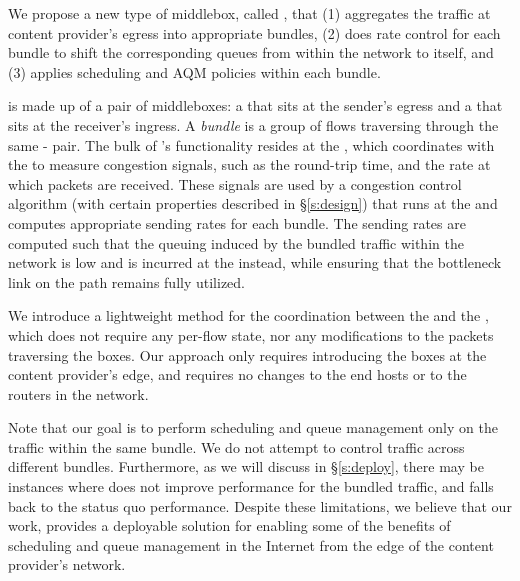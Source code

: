 We propose a new type of middlebox, called \name, that (1) aggregates the traffic at content provider's egress into appropriate bundles, (2) does rate control for each bundle to shift the corresponding queues from within the network to itself, and (3) applies scheduling and AQM policies within each bundle. 

\name is made up of a pair of middleboxes: a \emph{\inbox} that sits at the sender's egress and a \emph{\outbox} that sits at the receiver's ingress. A \emph{bundle} is a group of flows traversing through the same \inbox{}-\outbox{} pair. The bulk of \name's functionality resides at the \inbox, which coordinates with the \outbox to measure congestion signals, such as the round-trip time, and the rate at which packets are received. These signals are used by a congestion control algorithm (with certain properties described in \S\ref{s:design}) that runs at the \inbox and computes appropriate sending rates for each bundle. The sending rates are computed such that the queuing induced by the bundled traffic within the network is low and is incurred at the \inbox instead, while ensuring that the bottleneck link on the path remains fully utilized. 
 
We introduce a lightweight method for the coordination between the \inbox and the \outbox, which does not require any per-flow state, nor any modifications to the packets traversing the \name boxes. Our approach only requires introducing the \name boxes at the content provider's edge, and requires no changes to the end hosts or to the routers in the network. 
 
Note that our goal is to perform scheduling and queue management only on the traffic within the same bundle. We do not attempt to control traffic across different bundles. Furthermore, as we will discuss in \S\ref{s:deploy}, there may be instances where \name does not improve performance for the bundled traffic, and falls back to the status quo performance. Despite these limitations, we believe that our work, provides a deployable solution for enabling some of the benefits of scheduling and queue management in the Internet from the edge of the content provider's network.
 
